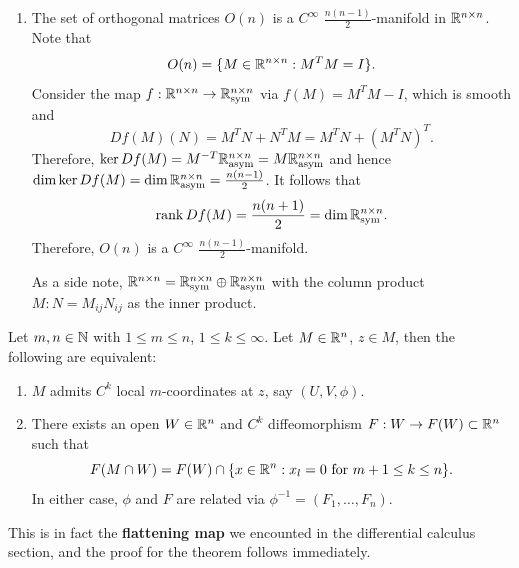 \documentclass[a4paper]{article}
\begin{document}
\begin{eg}
\begin{enumerate}
    \item The set of orthogonal matrices $O(n)$ is a $C^\infty$ $\frac{n
          (n - 1)}{2}$-manifold in $\mathbb{R}^{n \times n}$. Note that
          \[
            O(n) = \{M \in \mathbb{R}^{n \times n} : M^T M = I\}.
          \]
          Consider the map $f : \mathbb{R}^{n \times n} \to \mathbb{R}^{n \times
          n}_{\text{sym}}$ via $f(M) = M^T M - I$, which is smooth and
          \[
            Df(M)(N) = M^T N + N^T M = M^T N + (M^T N)^T.
          \]
          Therefore, $\ker Df(M) = M^{-T} \mathbb{R}^{n \times n}_{\text{asym}} =
          M \mathbb{R}^{n \times n}_{\text{asym}}$ and hence $\dim \ker Df(M) =
          \dim \mathbb{R}^{n \times n}_{\text{asym}} = \frac{n (n - 1)}{2}$. It
          follows that
          \[
            \operatorname{rank} Df(M) = \frac{n (n + 1)}{2} = \dim \mathbb{R}^{n \times n}_{\text{sym}}.
          \]
          Therefore, $O(n)$ is a $C^\infty$ $\frac{n(n-1)}{2}$-manifold.

          As a side note, $\mathbb{R}^{n \times n} = \mathbb{R}^{n \times n}_{\text{sym}}
          \oplus \mathbb{R}^{n \times n}_{\text{asym}}$ with the column product $M
          : N = M_{ij} N_{ij}$ as the inner product.
  \end{enumerate}
\end{eg}

\begin{thm}
  Let $m, n \in \mathbb{N}$ with $1 \leq m \leq n$, $1 \leq k \leq \infty$. Let $M
    \in \mathbb{R}^n$, $z \in M$, then the following are equivalent:
  \begin{enumerate}
    \item $M$ admits $C^k$ local $m$-coordinates at $z$,
          say $(U, V, \phi)$.

    \item There exists an open $W \in \mathbb{R}^n$ and $C^k$ diffeomorphism $F :
          W \to F(W) \subset \mathbb{R}^n$ such that
          \[
            F(M \cap W) = F(W) \cap \{x \in \mathbb{R}^n : x_l = 0 \text{ for
          $m + 1 \leq k \leq n$}\}.
          \]
          In either case, $\phi$ and $F$ are related via $\phi^{-1} =
          (F_1, \dots, F_n)$.
  \end{enumerate}
\end{thm}

This is in fact the \textbf{flattening map} we encounted in the
differential calculus section, and the proof for the theorem follows
immediately.
\end{document}
